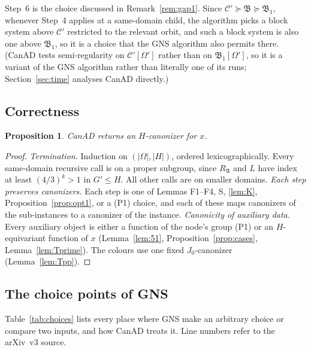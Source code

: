 \documentclass[11pt]{article}
\theoremstyle{plain}
\newtheorem{proposition}[theorem]{Proposition}
\theoremstyle{definition}
\theoremstyle{remark}
\theoremstyle{named}
\theoremstyle{namedrm}
\newcommand{\fB}{\mathfrak{B}}
\newcommand{\fA}{\mathfrak{A}}
\newcommand{\Cp}{\mathcal{C}'}
\begin{document}
Step~6 is the choice discussed in Remark~\ref{rem:gap1}. Since $\Cp\succeq\fB\succeq\fB_1$, whenever Step~4
applies at a same-domain child, the algorithm picks a block system above $\Cp$ restricted to the relevant
orbit, and such a block system is also one above $\fB_1$, so it is a choice that the GNS algorithm also
permits there. (CanAD tests semi-regularity on $\Cp[\Omega']$ rather than on $\fB_1[\Omega']$, so it is a
variant of the GNS algorithm rather than literally one of its runs; Section~\ref{sec:time} analyses CanAD
directly.)

\subsection{Correctness}

\begin{proposition}\label{prop:correct}
CanAD returns an $H$-canonizer for $x$.
\end{proposition}
\begin{proof}
\emph{Termination.} Induction on $(|\Omega|,|H|)$, ordered lexicographically. Every same-domain recursive
call is on a proper subgroup, since $R_\fA$ and $L$ have index at least $(4/3)^k>1$ in $G'\le H$. All other
calls are on smaller domains.
\emph{Each step preserves canonizers.} Each step is one of Lemmas F1--F4, S, \ref{lem:K}, Proposition~\ref{prop:opt1},
or a (P1) choice, and each of these maps canonizers of the sub-instances to a canonizer of the
instance.
\emph{Canonicity of auxiliary data.} Every auxiliary object is either a function of the node's group (P1)
or an $H$-equivariant function of $x$ (Lemma~\ref{lem:51}, Proposition~\ref{prop:cases},
Lemma~\ref{lem:Tprime}). The colours use one fixed $J_0$-canonizer (Lemma~\ref{lem:Tpp}).
\end{proof}

\subsection{The choice points of GNS}

Table~\ref{tab:choices} lists every place where GNS make an arbitrary choice or compare two inputs,
and how CanAD treats it. Line numbers refer to the arXiv~v3 source.
\end{document}
